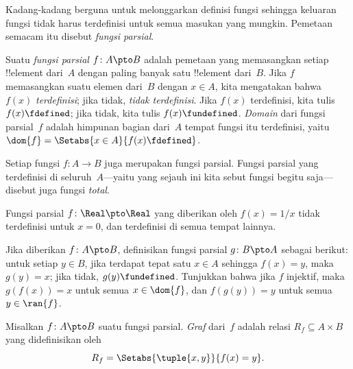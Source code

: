 \documentclass[../../../include/open-logic-section]{subfiles}
\begin{document}


\begin{explain}
Kadang-kadang berguna untuk melonggarkan definisi fungsi sehingga keluaran
fungsi tidak harus terdefinisi untuk semua masukan yang mungkin. Pemetaan
semacam itu disebut \emph{fungsi parsial}.
\end{explain}

\begin{defn}
Suatu \emph{fungsi parsial} $f \colon A \pto B$ adalah pemetaan yang
memasangkan setiap !!{element} dari~$A$ dengan paling banyak satu !!{element}
dari~$B$. Jika $f$ memasangkan suatu elemen dari~$B$ dengan $x \in A$, kita
mengatakan bahwa $f(x)$ \emph{terdefinisi}; jika tidak, \emph{tidak
terdefinisi}. Jika $f(x)$ terdefinisi, kita tulis $f(x) \fdefined$; jika tidak,
kita tulis $f(x) \fundefined$. \emph{Domain} dari fungsi parsial~$f$ adalah
himpunan bagian dari~$A$ tempat fungsi itu terdefinisi, yaitu $\dom{f} =
\Setabs{x \in A}{f(x) \fdefined}$.
\end{defn}

\begin{ex}
Setiap fungsi $f\colon A \to B$ juga merupakan fungsi parsial. Fungsi parsial
yang terdefinisi di seluruh~$A$---yaitu yang sejauh ini kita sebut fungsi
begitu saja---disebut juga fungsi \emph{total}.
\end{ex}

\begin{ex}
Fungsi parsial $f \colon \Real \pto \Real$ yang diberikan oleh $f(x) = 1/x$
tidak terdefinisi untuk $x = 0$, dan terdefinisi di semua tempat lainnya.
\end{ex}

\begin{prob}
Jika diberikan $f\colon A \pto B$, definisikan fungsi parsial $g\colon B \pto
A$ sebagai berikut: untuk setiap $y \in B$, jika terdapat tepat satu $x \in A$
sehingga $f(x) = y$, maka $g(y) = x$; jika tidak, $g(y) \fundefined$.
Tunjukkan bahwa jika $f$ injektif, maka $g(f(x)) = x$ untuk semua $x \in
\dom{f}$, dan $f(g(y)) = y$ untuk semua $y \in \ran{f}$.
\end{prob}

\begin{defn}
Misalkan $f\colon A \pto B$ suatu fungsi parsial. \emph{Graf} dari~$f$ adalah
relasi $R_f \subseteq A \times B$ yang didefinisikan oleh
\[
R_f = \Setabs{\tuple{x,y}}{f(x) = y}.
\]
\end{defn}
\end{document}
